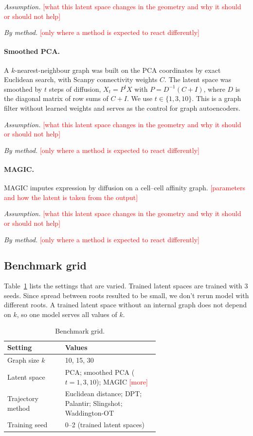 \documentclass[12pt,a4paper]{article}
\newcommand{\todo}[1]{\textcolor{red}{[#1]}}
\begin{document}
\emph{Assumption.} \todo{what this latent space changes in the geometry and why it should or should not help}

\emph{By method.} \todo{only where a method is expected to react differently}

\paragraph{Smoothed PCA.}
A $k$-nearest-neighbour graph was built on the PCA coordinates by exact Euclidean
search, with Scanpy connectivity weights $C$. The latent space was smoothed by $t$ steps of
diffusion, $X_t = P^t X$ with $P = D^{-1}(C+I)$, where $D$ is the diagonal matrix of row sums
of $C+I$. We use $t \in \{1, 3, 10\}$. This is a graph filter without learned weights and serves
as the control for graph autoencoders.

\emph{Assumption.} \todo{what this latent space changes in the geometry and why it should or should not help}

\emph{By method.} \todo{only where a method is expected to react differently}

\paragraph{MAGIC.}
MAGIC \cite{vandijk2018magic} imputes expression by diffusion on a cell--cell affinity graph.
\todo{parameters and how the latent is taken from the output}

\emph{Assumption.} \todo{what this latent space changes in the geometry and why it should or should not help}

\emph{By method.} \todo{only where a method is expected to react differently}

\subsection{Benchmark grid}
Table~\ref{tab:grid} lists the settings that are varied. Trained latent spaces are trained with 3 seeds. Since spread
between roots resulted to be small, we don't rerun model with different roots. A trained latent space without
an internal graph does not depend on $k$, so one model serves all values of $k$.

\begin{table}[ht]
\centering\small
\caption{Benchmark grid.}
\label{tab:grid}
\begin{tabular}{lp{0.62\linewidth}}
\toprule
Setting & Values \\
\midrule
Graph size $k$      & 10, 15, 30 \\
Latent space        & PCA; smoothed PCA ($t = 1, 3, 10$); MAGIC \todo{more} \\
Trajectory method   & Euclidean distance; DPT; Palantir; Slingshot; Waddington-OT \\
Training seed       & 0--2 (trained latent spaces) \\
\bottomrule
\end{tabular}
\end{table}
\end{document}
